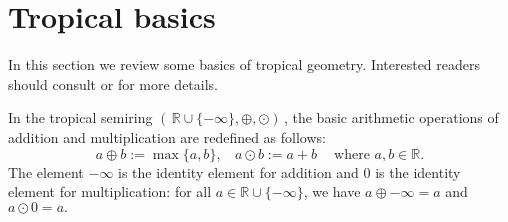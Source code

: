 \documentclass[12pt]{extarticle}
\numberwithin{theorem}{section}
\newcommand{\RR}{\mathbb{R}}
\newcommand{\R}{\mathbb{R}}
\newcommand{\TP}{\mathbb{TP}}
\begin{document}
\begin{comment}
This paper is organized as follows: 
 , we
discuss the interpretation of tropical principal component analysis  over the tropical projective space,
which is analogous to the 
classical PCA in the Euclidean space $\R^e$ but using the 
tropical metric in the max-plus algebra.  We define them as a Stiefel tropical
linear space of rank $s-1$ 
in $\TP^{e-1}$ minimizing the sum of the distances between
each data point and its projection.  In the section we show some
theoretical properties of the tropical PCA, including an explicit approach to computing the $(e-1)$th tropical PCA of $e$ points. We also describe the results of some computations approximating the tropical PCA for some datasets coming from phylogenetics: a simulated dataset as well as an empirical dataset of Apicomplexa genome data from \cite{KWK}.
 In Section
\ref{trop:poly}, motivated by the work of \cite{NTWY}, we define a tropical PCA on the
space of ultrametrics as a tropical
convex hull and then we show that
finding the vertices of the tropical convex hull can be formulated
as a mixed integer programming problem.  Since it is expensive to
compute the tropical PCA in general, we also discuss a
heuristic method to approximate them. In
Section \ref{sim}, we apply this approach the same datasets described above.  We end this paper with some
discussions on future directions.
  

\end{comment}
\section{Tropical basics}\label{def:trop}
In this section we review some basics of tropical geometry. Interested readers should consult \cite{MS} or \cite{J} for more details.

In the tropical semiring $(\,\RR \cup \{-\infty\},\oplus,\odot)\,$, the basic
arithmetic operations of addition and multiplication are redefined as follows:
$$a \oplus b := \max\{a, b\}, ~~~~ a \odot b := a + b ~~~~\text{  where } a, b \in \RR.$$
The element $-\infty$ is the identity element for addition and 0 is the identity element for multiplication: for all $a\in \RR\cup \{-\infty\}$, we have $a \oplus -\infty = a$ and $a \odot 0 = a .$
\end{document}
